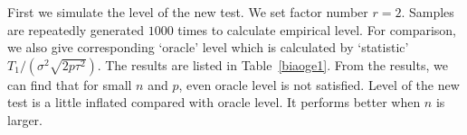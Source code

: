 \documentclass[review]{elsarticle}
\theoremstyle{plain}
\theoremstyle{definition}
\theoremstyle{remark}
\begin{document}

First we simulate the level of the new test. We set factor number $r=2$.
Samples are repeatedly generated $1000$ times to calculate empirical level.
For comparison, we also give corresponding `oracle' level which is calculated by `statistic' ${T_1}/(\sigma^2\sqrt{2p\tau^2})$.
The results are listed in
Table~\ref{biaoge1}. From the results, we can find that for small $n$ and $p$, even oracle level is not satisfied.
Level of the new test is  a little inflated compared with oracle level. It performs better when $n$ is larger.


\end{document}
